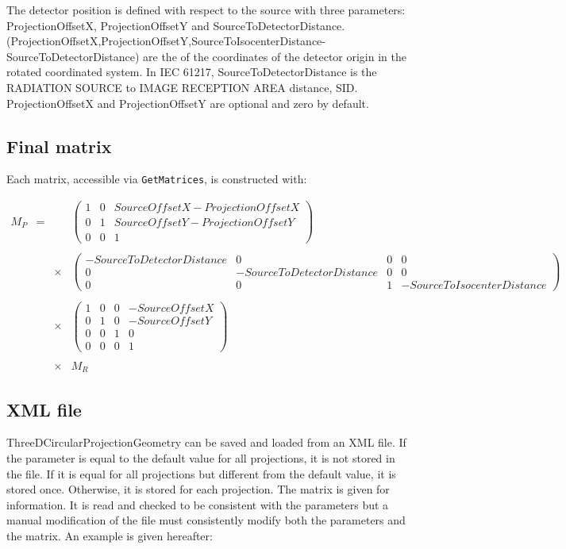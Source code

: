 \documentclass{article}
\begin{document}
The detector position is defined with respect to the source with three parameters: ProjectionOffsetX, ProjectionOffsetY and SourceToDetectorDistance. (ProjectionOffsetX,ProjectionOffsetY,SourceToIsocenterDistance-SourceToDetectorDistance) are the of the coordinates of the detector origin in the rotated coordinated system. In IEC 61217, SourceToDetectorDistance is the RADIATION SOURCE to IMAGE RECEPTION AREA distance, SID. ProjectionOffsetX and ProjectionOffsetY are optional and zero by default.

\subsection{Final matrix}

Each matrix, accessible via \verb+GetMatrices+, is constructed with:

$$
\begin{array}{lcll}
  M_P & = & & %
  \begin{pmatrix}
    1 & 0 & SourceOffsetX-ProjectionOffsetX  \\
    0 & 1 & SourceOffsetY-ProjectionOffsetY  \\
    0 & 0 & 1
  \end{pmatrix} %
  \\ \\ & & \times & %
  \begin{pmatrix}
    -SourceToDetectorDistance & 0 & 0 & 0  \\
    0 & -SourceToDetectorDistance & 0 & 0  \\
    0 & 0 & 1 & -SourceToIsocenterDistance
  \end{pmatrix} %
  \\ \\ & & \times & %
  \begin{pmatrix}
    1 & 0 & 0 & -SourceOffsetX  \\
    0 & 1 & 0 & -SourceOffsetY  \\
    0 & 0 & 1 & 0 \\
    0 & 0 & 0 & 1
  \end{pmatrix} %
  \\ \\ & & \times & %
  M_R
\end{array}
$$

\subsection{XML file}

ThreeDCircularProjectionGeometry can be saved and loaded from an XML file. If the parameter is equal to the default value for all projections, it is not stored in the file. If it is equal for all projections but different from the default value, it is stored once. Otherwise, it is stored for each projection. The matrix is given for information. It is read and checked to be consistent with the parameters but a manual modification of the file must consistently modify both the parameters and the matrix. An example is given hereafter:
\end{document}
